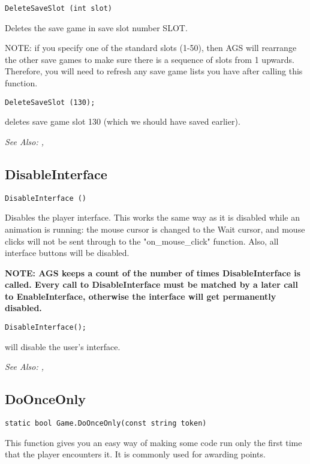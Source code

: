 \begin{verbatim}
DeleteSaveSlot (int slot)
\end{verbatim}
Deletes the save game in save slot number SLOT.

NOTE: if you specify one of the standard slots (1-50), then AGS will rearrange the other
save games to make sure there is a sequence of slots from 1 upwards. Therefore, you will
need to refresh any save game lists you have after calling this function.

\begin{verbatim}
DeleteSaveSlot (130);
\end{verbatim}
deletes save game slot 130 (which we should have saved earlier).

\it{See Also:} , 


\subsection{DisableInterface}\label{DisableInterface}%

\begin{verbatim}
DisableInterface ()
\end{verbatim}
Disables the player interface. This works the same way as it is disabled
while an animation is running: the mouse cursor is changed to the Wait
cursor, and mouse clicks will not be sent through to the "on_mouse_click"
function. Also, all interface buttons will be disabled.

\bf{NOTE:} AGS keeps a count of the number of times DisableInterface is called. Every
call to DisableInterface must be matched by a later call to EnableInterface, otherwise
the interface will get permanently disabled.

\begin{verbatim}
DisableInterface();
\end{verbatim}
will disable the user's interface.

\it{See Also:} , 


\subsection{DoOnceOnly}\label{Game.DoOnceOnly}%

\begin{verbatim}
static bool Game.DoOnceOnly(const string token)
\end{verbatim}
This function gives you an easy way of making some code run only the first time that
the player encounters it. It is commonly used for awarding points.

